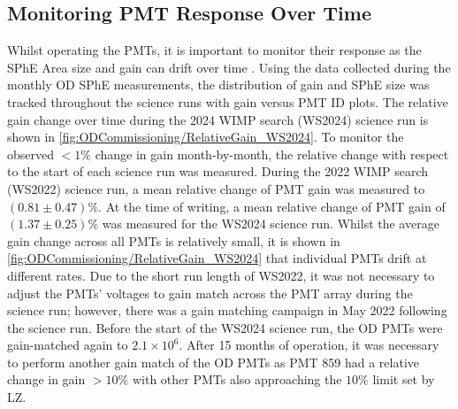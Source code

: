 \subsection{Monitoring PMT Response Over Time}
Whilst operating the PMTs, it is important to monitor their response as the SPhE Area size and gain can drift over time \cite{DayaBay:2016ggj,Super-Kamiokande:2023jbt}. Using the data collected during the monthly OD SPhE measurements, the distribution of gain and SPhE size was tracked throughout the science runs with gain versus PMT ID plots. The relative gain change over time during the 2024 WIMP search (WS2024) science run is shown in \autoref{fig:ODCommissioning/RelativeGain_WS2024}.
To monitor the observed $<1\%$ change in gain month-by-month, the relative change with respect to the start of each science run was measured. During the 2022 WIMP search (WS2022) science run, a mean relative change of PMT gain was measured to $(0.81\pm0.47)\%$. At the time of writing, a mean relative change of PMT gain of $(1.37\pm0.25)\%$ was measured for the WS2024 science run. Whilst the average gain change across all PMTs is relatively small, it is shown in \autoref{fig:ODCommissioning/RelativeGain_WS2024} that individual PMTs drift at different rates. Due to the short run length of WS2022, it was not necessary to adjust the PMTs' voltages to gain match across the PMT array during the science run; however, there was a gain matching campaign in May 2022 following the science run. Before the start of the WS2024 science run, the OD PMTs were gain-matched again to $2.1\times10^{6}$. After 15 months of operation, it was necessary to perform another gain match of the OD PMTs as PMT 859 had a relative change in gain $>10\%$ with other PMTs also approaching the $10\%$ limit set by LZ.

